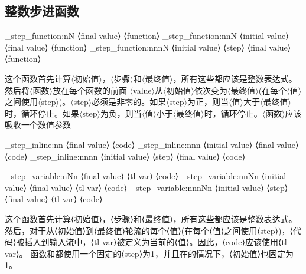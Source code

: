 \subsection{整数步进函数}

\begin{my}
	\int_step_function:nN {⟨final value⟩} ⟨function⟩
	\int_step_function:nnN {⟨initial value⟩} {⟨final value⟩} ⟨function⟩
	\int_step_function:nnnN {⟨initial value⟩} {⟨step⟩} {⟨final value⟩} ⟨function⟩
\end{my}


这个函数首先计算$\langle$初始值$\rangle$，$\langle$步骤$\rangle$和$\langle$最终值$\rangle$，所有这些都应该是整数表达式。然后将$\langle$函数$\rangle$放在每个函数的前面
$\langle$value$\rangle$从$\langle$初始值$\rangle$依次变为$\langle$最终值$\rangle$(在每个$\langle$值$\rangle$之间使用$\langle$step$\rangle$)。$\langle$step$\rangle$必须是非零的。如果$\langle$step$\rangle$为正，则当$\langle$值$\rangle$大于$\langle$最终值$\rangle$时，循环停止。如果$\langle$step$\rangle$为负，则当$\langle$值$\rangle$小于$\langle$最终值$\rangle$时，循环停止。$\langle$函数$\rangle$应该吸收一个数值参数

\begin{my}
	\int_step_inline:nn {⟨final value⟩} {⟨code⟩}
	\int_step_inline:nnn {⟨initial value⟩} {⟨final value⟩} {⟨code⟩}
	\int_step_inline:nnnn {⟨initial value⟩} {⟨step⟩} {⟨final value⟩} {⟨code⟩}
\end{my}


\begin{my}
	\int_step_variable:nNn {⟨final value⟩} ⟨tl var⟩ {⟨code⟩}
	\int_step_variable:nnNn {⟨initial value⟩} {⟨final value⟩} ⟨tl var⟩ {⟨code⟩}
	\int_step_variable:nnnNn {⟨initial value⟩} {⟨step⟩} {⟨final value⟩} ⟨tl var⟩
	{⟨code⟩}
\end{my}

这个函数首先计算⟨初始值⟩，⟨步骤⟩和⟨最终值⟩，所有这些都应该是整数表达式。然后，对于从⟨初始值⟩到⟨最终值⟩轮流的每个⟨值⟩(在每个⟨值⟩之间使用⟨step⟩)，⟨代码⟩被插入到输入流中，⟨tl var⟩被定义为当前的⟨值⟩。因此，⟨code⟩应该使用⟨tl var⟩。
函数和都使用一个固定的⟨step⟩为1，并且在的情况下，⟨初始值⟩也固定为1。

